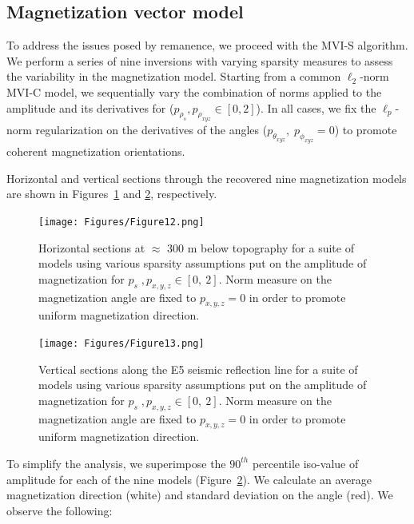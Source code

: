 \documentclass[paper]{geophysics}
\begin{document}
\subsection{Magnetization vector model}
To address the issues posed by remanence, we proceed with the MVI-S algorithm.
We perform a series of nine inversions with varying sparsity measures to assess the variability in the magnetization model. Starting from a common $\ell_2$-norm MVI-C model, we sequentially vary the combination of norms applied to the amplitude and its derivatives for ($p_{\rho_s}, p_{\rho_{xyz}} \in [0, 2]$). In all cases, we fix the $\ell_p$-norm regularization on the derivatives of the angles ($p_{\theta_{xyz}},\;p_{\phi_{xyz}} =0$) to promote coherent magnetization orientations.

Horizontal and vertical sections through the recovered nine magnetization models are shown in Figures~\ref{MVIS_Hsections} and \ref{MVIS_Vsections}, respectively.

\begin{figure}[p!]
\texttt{[image: Figures/Figure12.png]}
\caption{Horizontal sections at $\approx$ 300 m below topography for a suite of models using various sparsity assumptions put on the amplitude of magnetization for $p_s\;, p_{x,y,z} \in [0,\: 2]$. Norm measure on the magnetization angle are fixed to $p_{x,y,z}=0$ in order to promote uniform magnetization direction.}
\label{MVIS_Hsections}
\end{figure}

\begin{figure}[p!]
\texttt{[image: Figures/Figure13.png]}
\caption{Vertical sections along the E5 seismic reflection line for a suite of models using various sparsity assumptions put on the amplitude of magnetization for $p_s\;, p_{x,y,z} \in [0,\: 2]$. Norm measure on the magnetization angle are fixed to $p_{x,y,z}=0$ in order to promote uniform magnetization direction.}
\label{MVIS_Vsections}
\end{figure}

To simplify the analysis, we superimpose the $90^{th}$ percentile iso-value of amplitude for each of the nine models (Figure~\ref{MVIS_Vsections}). We calculate an average magnetization direction (white) and standard deviation on the angle (red). We observe the following:
\end{document}
